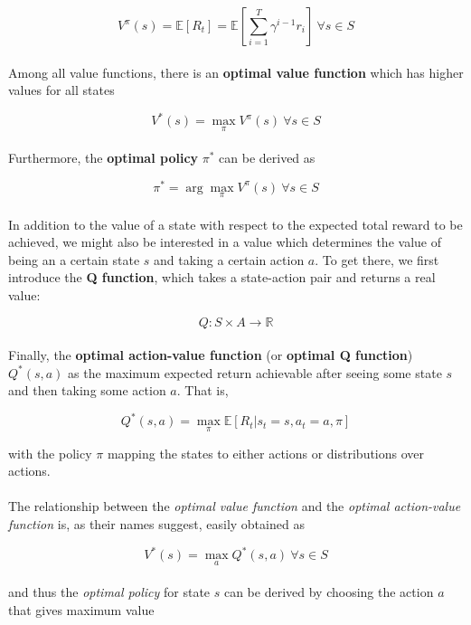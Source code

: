 \begin{equation}\label{eq:value-function}
V^{\pi}(s)=\mathbb{E}[R_t]=\mathbb{E}[\sum_{i=1}^{T}{\gamma^{i-1}{r_{i}}}]\ \forall s \in S
\end{equation}
\\
Among all value functions, there is an \textbf{optimal value function} which has higher values for all states

\begin{equation}\label{eq:optimal-value-function}
V^{*}(s)=\max_{\pi}V^{\pi}(s)\ \forall s \in S
\end{equation}
\\
Furthermore, the \textbf{optimal policy} $\pi^*$ can be derived as

\begin{equation}\label{eq:value-function-policy}
\pi^{*}=\arg\max_{\pi}V^{\pi}(s)\ \forall{s}\in{S}
\end{equation}
\\
In addition to the value of a state with respect to the expected total reward to be achieved, we might also be interested in a value which determines the value of being an a certain state $s$ and taking a certain action $a$. 
To get there, we first introduce the \textbf{Q function}, which takes a state-action pair and returns a real value:

\begin{equation}\label{eq:q-function}
Q:S\times{A}\rightarrow{\mathbb{R}}
\end{equation}
\\
Finally, the \textbf{optimal action-value function} (or \textbf{optimal Q function}) $Q^*(s,a)$ as the maximum expected return achievable after seeing some state $s$ and then taking some action $a$. That is, 

\begin{equation}\label{eq:optimal-action-value-function}
Q^*(s,a)=\max_{\pi}\mathbb{E} [ R_t | s_t=s, a_t=a, \pi ]
\end{equation}

with the policy $\pi$ mapping the states to either actions or distributions over actions. 
\\
\\
The relationship between the \textit{optimal value function} and the \textit{optimal action-value function} is, as their names suggest, easily obtained as

\begin{equation}
V^*(s)=\max_{a}Q^*(s,a)\ \forall{s}\in{S}
\end{equation}
\\
and thus the \textit{optimal policy} for state $s$ can be derived by choosing the action $a$ that gives maximum value

